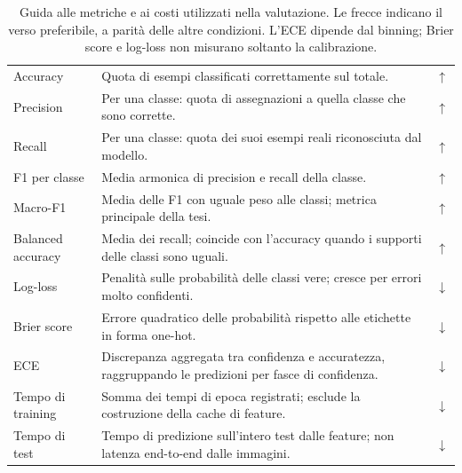 \begin{table}[tbp]
\centering
\small
\renewcommand{\arraystretch}{1.18}
\caption{Guida alle metriche e ai costi utilizzati nella valutazione.
Le frecce indicano il verso preferibile, a parità delle altre condizioni.
L'ECE dipende dal binning; Brier score e log-loss non misurano soltanto
la calibrazione.}
\label{tab:guida-metriche}
\begin{tabularx}{\textwidth}{@{}p{2.5cm}Yc@{}}
\toprule
{}
 &  &  \\
\midrule
Accuracy & Quota di esempi classificati correttamente sul totale. & \(\uparrow\) \\
Precision & Per una classe: quota di assegnazioni a quella classe che sono corrette. & \(\uparrow\) \\
Recall & Per una classe: quota dei suoi esempi reali riconosciuta dal modello. & \(\uparrow\) \\
F1 per classe & Media armonica di precision e recall della classe. & \(\uparrow\) \\
Macro-F1 & Media delle F1 con uguale peso alle classi; metrica principale della tesi. & \(\uparrow\) \\
Balanced accuracy & Media dei recall; coincide con l'accuracy quando i supporti delle classi sono uguali. & \(\uparrow\) \\
Log-loss & Penalità sulle probabilità delle classi vere; cresce per errori molto confidenti. & \(\downarrow\) \\
Brier score & Errore quadratico delle probabilità rispetto alle etichette in forma one-hot. & \(\downarrow\) \\
ECE & Discrepanza aggregata tra confidenza e accuratezza, raggruppando le predizioni per fasce di confidenza. & \(\downarrow\) \\
Tempo di training & Somma dei tempi di epoca registrati; esclude la costruzione della cache di feature. & \(\downarrow\) \\
Tempo di test & Tempo di predizione sull'intero test dalle feature; non latenza end-to-end dalle immagini. & \(\downarrow\) \\
\bottomrule
\end{tabularx}
\end{table}

